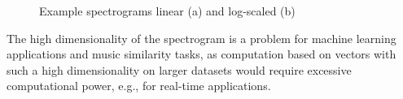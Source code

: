 \begin{figure}[htbp]
	\centering
	\begin{subfigure}{0.5\textwidth}
		\centering
		\label{laylaspec}
	\end{subfigure}%
	\begin{subfigure}{0.5\textwidth}
		\centering
		\label{laylaspecfft}
	\end{subfigure}
	\caption{Example spectrograms linear (a) and log-scaled (b)}
	\label{fig:test}
\end{figure}
\FloatBarrier
\noindent The high dimensionality of the spectrogram is a problem for machine learning applications and music similarity tasks, as computation based on vectors with such a high dimensionality on larger datasets would require excessive computational power, e.g., for real-time applications.
